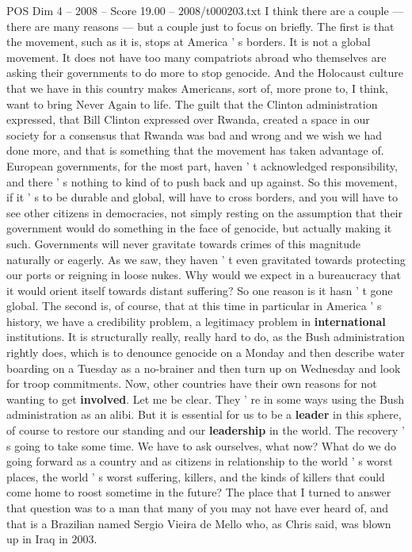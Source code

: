 \begin{textsample}{POS Dim 4 – 2008 – Score 19.00 – 2008/t000203.txt}
I think there are a couple — there are many reasons — but a couple just to focus on briefly.
The first is that the movement, such as it is, stops at America ' s borders.
It is not a global movement.
It does not have too many compatriots abroad who themselves are asking their governments to do more to stop genocide.
And the Holocaust culture that we have in this country makes Americans, sort of, more prone to, I think, want to bring Never Again to life.
The guilt that the Clinton administration expressed, that Bill Clinton expressed over Rwanda, created a space in our society for a consensus that Rwanda was bad and wrong and we wish we had done more, and that is something that the movement has taken advantage of.
European governments, for the most part, haven ' t acknowledged responsibility, and there ' s nothing to kind of to push back and up against.
So this movement, if it ' s to be durable and global, will have to cross borders, and you will have to see other citizens in democracies, not simply resting on the assumption that their government would do something in the face of genocide, but actually making it such.
Governments will never gravitate towards crimes of this magnitude naturally or eagerly.
As we saw, they haven ' t even gravitated towards protecting our ports or reigning in loose nukes.
Why would we expect in a bureaucracy that it would orient itself towards distant suffering?
So one reason is it hasn ' t gone global.
The second is, of course, that at this time in particular in America ' s history, we have a credibility problem, a legitimacy problem in \textbf{international} institutions.
It is structurally really, really hard to do, as the Bush administration rightly does, which is to denounce genocide on a Monday and then describe water boarding on a Tuesday as a no-brainer and then turn up on Wednesday and look for troop commitments.
Now, other countries have their own reasons for not wanting to get \textbf{involved}.
Let me be clear.
They ' re in some ways using the Bush administration as an alibi.
But it is essential for us to be a \textbf{leader} in this sphere, of course to restore our standing and our \textbf{leadership} in the world.
The recovery ' s going to take some time.
We have to ask ourselves, what now?
What do we do going forward as a country and as citizens in relationship to the world ' s worst places, the world ' s worst suffering, killers, and the kinds of killers that could come home to roost sometime in the future?
The place that I turned to answer that question was to a man that many of you may not have ever heard of, and that is a Brazilian named Sergio Vieira de Mello who, as Chris said, was blown up in Iraq in 2003.

\end{textsample}
